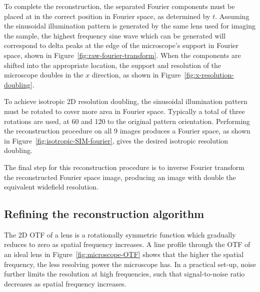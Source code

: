 To complete the reconstruction, the separated Fourier components must be placed at in the correct position in Fourier space, as determined by $t$. 
Assuming the sinusoidal illumination pattern is generated by the same lens used for imaging the sample, the highest frequency sine wave which can be generated will correspond to delta peaks at the edge of the microscope's support in Fourier space, shown in Figure~\ref{fig:raw-fourier-transform}. 
When the components are shifted into the appropriate location, the support and resolution of the microscope doubles in the $x$ direction, as shown in Figure~\ref{fig:x-resolution-doubling}. 

To achieve isotropic 2D resolution doubling, the sinusoidal illumination pattern must be rotated to cover more area in Fourier space. 
Typically a total of three rotations are used, at \SI{60}{\deg} and \SI{120}{\deg} to the original pattern orientation. 
Performing the reconstruction procedure on all 9 images produces a Fourier space, as shown in Figure~\ref{fig:isotropic-SIM-fourier}, gives the desired isotropic resolution doubling. 

The final step for this reconstruction procedure is to inverse Fourier transform the reconstructed Fourier space image, producing an image with double the equivalent widefield resolution. 


\subsection{Refining the reconstruction algorithm}
The 2D OTF of a lens is a rotationally symmetric function which gradually reduces to zero as spatial frequency increases. 
A line profile through the OTF of an ideal lens in Figure~\ref{fig:microscope-OTF} shows that the higher the spatial frequency, the less resolving power the microscope has.
In a practical set-up, noise further limits the resolution at high frequencies, such that signal-to-noise ratio decreases as spatial frequency increases. 

